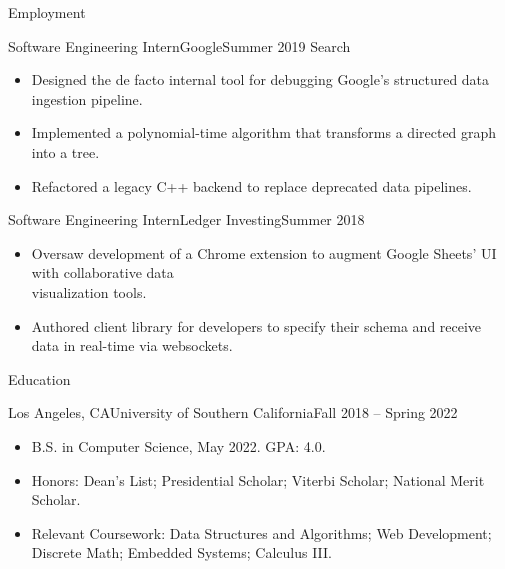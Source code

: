 \documentclass[calibri]{mcdowellcv}
\begin{document}
\makeheader

\begin{cvsection}{Employment}
	\begin{cvsubsection}{Software Engineering Intern}{Google}{Summer 2019}
		Search
		\begin{itemize}
			\item Designed the de facto internal tool for debugging Google's structured data ingestion pipeline.
			\item Implemented a polynomial-time algorithm that transforms a directed graph into a tree.
			\item Refactored a legacy C++ backend to replace deprecated data pipelines.
		\end{itemize}
	\end{cvsubsection}

	\begin{cvsubsection}{Software Engineering Intern}{Ledger Investing}{Summer 2018}
		\begin{itemize}
			\item Oversaw development of a Chrome extension to augment Google Sheets’ UI with collaborative data \\visualization tools.
			\item Authored client library for developers to specify their schema and receive data in real-time via websockets.
		\end{itemize}
	\end{cvsubsection}
\end{cvsection}

\begin{cvsection}{Education}
	\begin{cvsubsection}{Los Angeles, CA}{University of Southern California}{Fall 2018 -- Spring 2022}
		\begin{itemize}
			\item B.S. in Computer Science, May 2022.  GPA: 4.0.
			\item Honors: Dean's List; Presidential Scholar; Viterbi Scholar; National Merit Scholar.
			\item Relevant Coursework: Data Structures and Algorithms; Web Development; Discrete Math; Embedded Systems; Calculus III.
		\end{itemize}
	\end{cvsubsection}
\end{cvsection}
\end{document}
